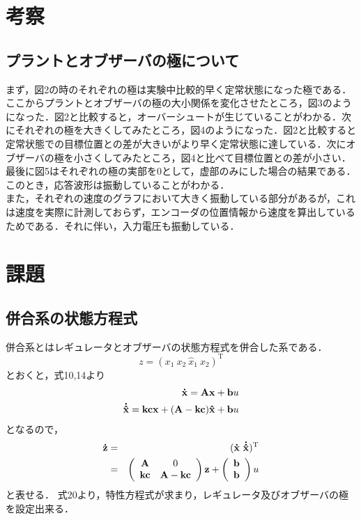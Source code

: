 \documentclass[11pt,a4paper]{jsarticle}
\begin{document}
\newpage
 \section{考察}
  \subsection{プラントとオブザーバの極について}
  まず，図2の時のそれぞれの極は実験中比較的早く定常状態になった極である．ここからプラントとオブザーバの極の大小関係を変化させたところ，図3のようになった．図2と比較すると，オーバーシュートが生じていることがわかる．次にそれぞれの極を大きくしてみたところ，図4のようになった．図2と比較すると定常状態での目標位置との差が大きいがより早く定常状態に達している．次にオブザーバの極を小さくしてみたところ，図4と比べて目標位置との差が小さい．最後に図5はそれぞれの極の実部を0として，虚部のみにした場合の結果である．このとき，応答波形は振動していることがわかる．\\
  また，それぞれの速度のグラフにおいて大きく振動している部分があるが，これは速度を実際に計測しておらず，エンコーダの位置情報から速度を算出しているためである．それに伴い，入力電圧も振動している．


\newpage
\section{課題}
\subsection{併合系の状態方程式}
併合系とはレギュレータとオブザーバの状態方程式を併合した系である．
\begin{equation}
 z = (x_1 \ x_2 \ \hat x_1 \ \hat x_2)^\mathrm{T} 
\end{equation}
とおくと，式10,14より
\begin{eqnarray*}
 {\bf \dot x = Ax + b}u \\
 {\bf \dot{\hat x} = kcx + (A - kc)\hat x + b}u \\
\end{eqnarray*}
となるので，
\begin{eqnarray}
 {\bf \dot z} & = & {\bf(\dot x \ \dot{\hat x})^\mathrm{T}} \nonumber \\
             & = & \left(\begin{array}{cc}
		          {\bf A} & 0\\
			  {\bf kc} & {\bf A-kc} \\
			 \end{array}\right){\bf z}
	     + \left(\begin{array}{c}
		{\bf b}\\
		{\bf b}\\
		     \end{array}\right) u
\end{eqnarray}
と表せる．
式20より，特性方程式が求まり，レギュレータ及びオブザーバの極を設定出来る．
\end{document}

